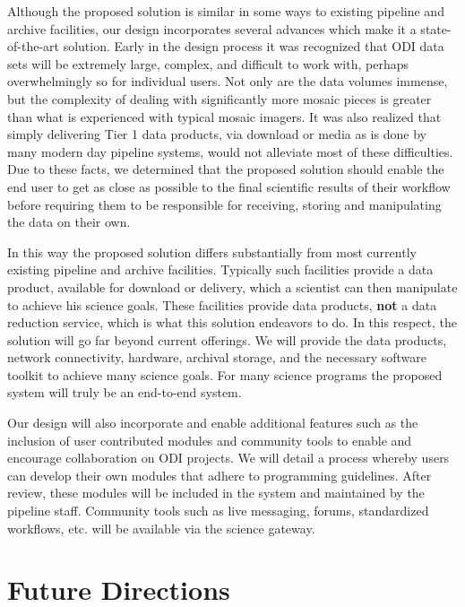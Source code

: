 \documentclass[10pt,conference]{IEEEtran}
\begin{document}
Although the proposed solution is similar in some ways to existing pipeline and archive facilities, our design incorporates several advances which make it a state-of-the-art solution. Early in the design process it was recognized that ODI data sets will be extremely large, complex, and difficult to work with, perhaps overwhelmingly so for individual users. Not only are the data volumes immense, but the complexity of dealing with significantly more mosaic pieces is greater than what is experienced with typical mosaic imagers. It was also realized that simply delivering Tier 1 data products, via download or media as is done by many modern day pipeline systems, would not alleviate most of these difficulties. Due to these facts, we determined that the proposed solution should enable the end user to get as close as possible to the final scientific results of their workflow before requiring them to be responsible for receiving, storing and manipulating the data on their own. 

In this way the proposed solution differs substantially from most currently existing pipeline and archive facilities. Typically such facilities provide a data product, available for download or delivery, which a scientist can then manipulate to achieve his science goals. These facilities provide data products, {\bf not} a data reduction service, which is what this solution endeavors to do. In this respect, the solution will go far beyond current offerings. We will provide the data products, network connectivity, hardware, archival storage, and the necessary software toolkit to achieve many science goals. For many science programs the proposed system will truly be an end-to-end system.

Our design will also incorporate and enable additional features such as the inclusion of user contributed modules and community tools to enable and encourage collaboration on ODI projects. We will detail a process whereby users can develop their own modules that adhere to programming guidelines. After review, these modules will be included in the system and maintained by the pipeline staff. Community tools such as live messaging, forums, standardized workflows, etc. will be available via the science gateway. 

\section{Future Directions}\label{sec:future}
\end{document}
